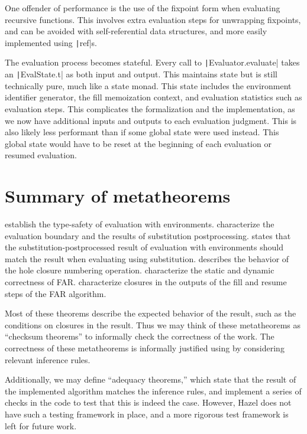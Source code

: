 One offender of performance is the use of the fixpoint form when evaluating recursive functions. This involves extra evaluation steps for unwrapping fixpoints, and can be avoided with self-referential data structures, and more easily implemented using \texttt|ref|s.

The evaluation process becomes stateful. Every call to \texttt|Evaluator.evaluate| takes an \texttt|EvalState.t| as both input and output. This maintains state but is still technically pure, much like a state monad. This state includes the environment identifier generator, the fill memoization context, and evaluation statistics such as evaluation steps. This complicates the formalization and the implementation, as we now have additional inputs and outputs to each evaluation judgment. This is also likely less performant than if some global state were used instead. This global state would have to be reset at the beginning of each evaluation or resumed evaluation.

\section{Summary of metatheorems}
\label{sec:metatheorem-summary}

 establish the type-safety of evaluation with environments.  characterize the evaluation boundary and the results of substitution postprocessing.  states that the substitution-postprocessed result of evaluation with environments should match the result when evaluating using substitution.  describes the behavior of the hole closure numbering operation.  characterize the static and dynamic correctness of FAR.  characterize closures in the outputs of the fill and resume steps of the FAR algorithm.

Most of these theorems describe the expected behavior of the result, such as the conditions on closures in the result. Thus we may think of these metatheorems as ``checksum theorems'' to informally check the correctness of the work. The correctness of these metatheorems is informally justified using by considering relevant inference rules.

Additionally, we may define ``adequacy theorems,'' which state that the result of the implemented algorithm matches the inference rules, and implement a series of checks in the code to test that this is indeed the case. However, Hazel does not have such a testing framework in place, and a more rigorous test framework is left for future work.

